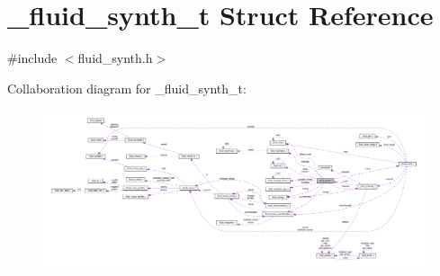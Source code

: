 \hypertarget{struct__fluid__synth__t}{}\section{\+\_\+fluid\+\_\+synth\+\_\+t Struct Reference}
\label{struct__fluid__synth__t}


{\ttfamily \#include $<$fluid\+\_\+synth.\+h$>$}



Collaboration diagram for \+\_\+fluid\+\_\+synth\+\_\+t\+:
\nopagebreak
\begin{figure}[H]
\begin{center}
\leavevmode
\includegraphics[width=350pt]{struct__fluid__synth__t__coll__graph}
\end{center}
\end{figure}
